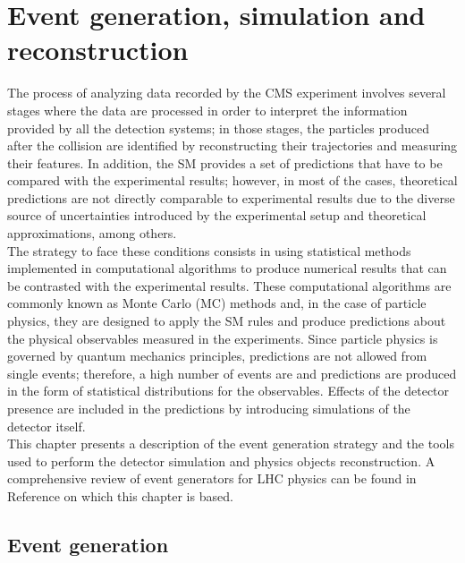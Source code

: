 \chapter{Event generation, simulation and reconstruction}\label{ch:gensimreco}

\noindent The process of analyzing data recorded by the CMS experiment involves several stages where the data are processed in order to interpret the information provided by all the detection systems; in those stages, the particles produced after the \pp collision are identified by reconstructing their trajectories and measuring their features. In addition, the SM provides a set of predictions that have to be compared with the experimental results; however, in most of the cases, theoretical predictions are not directly comparable to experimental results due to the diverse source of uncertainties introduced by the experimental setup and theoretical approximations, among others.\\

\noindent The strategy to face these conditions consists in using statistical methods implemented in computational algorithms to produce numerical results that can be contrasted with the experimental results. These computational algorithms are commonly known as Monte Carlo (MC) methods and, in the case of particle physics, they are designed to apply the SM rules and produce predictions about the physical observables measured in the experiments. Since particle physics is governed by quantum mechanics principles, predictions are not allowed from single events; therefore, a high number of events are  and predictions are produced in the form of statistical distributions for the observables. Effects of the detector presence are included in the predictions by introducing simulations of the detector itself.\\     

\noindent This chapter presents a description of the event generation strategy and the tools used to perform the detector simulation and physics objects reconstruction. A comprehensive review of event generators for LHC physics can be found in Reference \cite{gen} on which this chapter is based.  

\section{Event generation}

